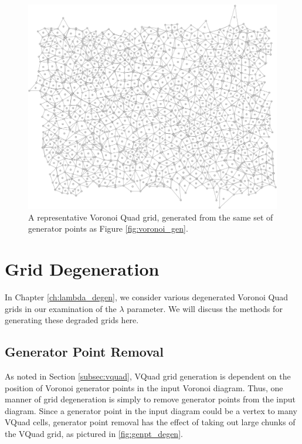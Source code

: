 \documentclass[a4paper,11pt,twoside]{report}
\begin{document}
\begin{figure}[htp]
\centering
\includegraphics[width=1.0\textwidth]{ch3_figs/vquad_stoma_v2}
\caption[Voronoi Quad Grid]{
  A representative Voronoi Quad grid, generated from the same set of generator points as Figure 
  \ref{fig:voronoi_gen}.
}
\label{fig:vquad_grid}
\end{figure}

\section{Grid Degeneration}

In Chapter \ref{ch:lambda_degen}, we consider various degenerated Voronoi Quad grids
in our examination of the $\lambda$ parameter. We will discuss the methods for generating these degraded grids here.

\subsection{Generator Point Removal}
\label{subsec:gen_pt_rem}
As noted in Section \ref{subsec:vquad}, VQuad grid generation is dependent on the position of Voronoi generator points in the input Voronoi diagram. Thus, one manner of grid degeneration is simply to remove generator points from the input diagram. Since a generator point in the input diagram could be a vertex to many VQuad cells, generator point removal has the effect of taking out large chunks of the VQuad grid, as pictured in \ref{fig:genpt_degen}.
\end{document}
